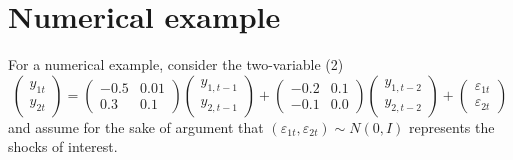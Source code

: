 \documentclass[12pt,fleqn]{article}
\newcommand{\vep}{\varepsilon}
\begin{document}
\section{Numerical example}

For a numerical example, consider the two-variable \VAR(2)
\begin{equation}
  \begin{pmatrix}
    y_{1t} \\ y_{2t}
  \end{pmatrix}
  =
  \begin{pmatrix}
    - 0.5 & 0.01 \\ 0.3 & 0.1
  \end{pmatrix}
  \begin{pmatrix}
    y_{1,t-1} \\ y_{2,t-1}
  \end{pmatrix}
  +
  \begin{pmatrix}
    -0.2 & 0.1 \\ -0.1 & 0.0
  \end{pmatrix}
  \begin{pmatrix}
    y_{1,t-2} \\ y_{2,t-2}
  \end{pmatrix}
  +
  \begin{pmatrix}
    \vep_{1t} \\ \vep_{2t}
  \end{pmatrix}
\end{equation}
and assume for the sake of argument that $(\vep_{1t},\vep_{2t}) \sim
N(0,I)$ represents the shocks of interest.
\end{document}
